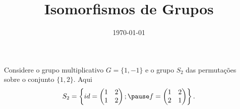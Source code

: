 \documentclass{beamer}
\title{Isomorfismos de Grupos}
\author[\autor]{\autor}
\institute[\instituto]{\instituto}
\date{\today}
\begin{document}
    \begin{frame}
        \maketitle
    \end{frame}


    \begin{frame}
        Considere o grupo multiplicativo $G = \{1, -1\}$ \pause e o grupo $S_2$ das permuta\c{c}\~oes sobre o conjunto $\{1,2\}$. \pause Aqui
        \[
            S_2 = \left\{id = \begin{pmatrix}
                1 & 2\\1 & 2
            \end{pmatrix}; \pause f = \begin{pmatrix}
                1 & 2\\2 & 1
            \end{pmatrix}\right\}.
        \]
    \end{frame}
\end{document}
